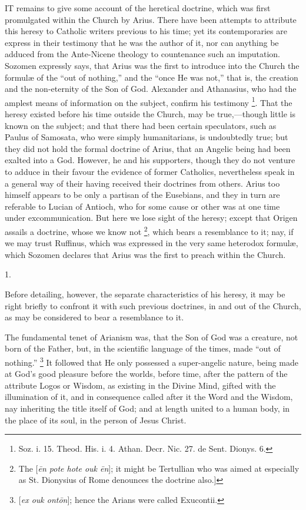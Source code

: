 IT remains to give some account of the
heretical doctrine, which was first promulgated within the Church by
Arius. There have been attempts to attribute this heresy to Catholic
writers previous to his time; yet its contemporaries are express in
their testimony that he was the author of it, nor can anything be
adduced from the Ante-Nicene theology to countenance such an
imputation. Sozomen expressly says, that Arius was the first to
introduce into the Church the formulæ of the ``out of
nothing,'' and the ``once He was not,'' that is, the
creation and the non-eternity of the Son of God. Alexander and
Athanasius, who had the amplest means of information on the subject,
confirm his testimony \footnote{Soz. i. 15. Theod. His. i. 4. Athan. Decr. Nic. 27. de Sent.
Dionys. 6.}.
That the heresy existed before his time outside the Church, may be
true,—though little is known on the subject; and that there had been
certain speculators, such as Paulus of Samosata, who were simply
humanitarians, is undoubtedly true; but they did not hold the formal
doctrine of Arius, that an Angelic being had been exalted into a God.
However, he and his supporters, though they do not venture to
adduce in their favour the evidence of former Catholics, nevertheless
speak in a general way of their having received their doctrines from
others. Arius too himself appears to be only a partisan of the
Eusebians, and they in turn are referable to Lucian of Antioch, who
for some cause or other was at one time under excommunication. But
here we lose sight of the heresy; except that Origen assails a
doctrine, whose we know not \footnote{The [\emph{\={e}n pote hote ouk \={e}n}];
it might be Tertullian who was aimed at especially as St. Dionysius of
Rome denounces the doctrine also.]},
which bears a resemblance to it; nay, if we may trust Ruffinus, which
was expressed in the very same heterodox formulæ, which Sozomen
declares that Arius was the first to preach within the Church.

1.

Before detailing, however, the separate characteristics of his
heresy, it may be right briefly to confront it with such previous
doctrines, in and out of the Church, as may be considered to bear a
resemblance to it.

The fundamental tenet of Arianism was, that the Son of God was a
creature, not born of the Father, but, in the scientific language of
the times, made ``out of nothing.'' \footnote{[\emph{ex ouk ont\={o}n}]; hence the
Arians were called Exucontii.} It followed that He only possessed a super-angelic nature,
being made at God's good pleasure before the worlds, before time,
after the pattern of the attribute Logos or Wisdom, as existing in the
Divine Mind, gifted with the illumination of it, and in consequence
called after it the Word and the Wisdom, nay inheriting the
title itself of God; and at length united to a human body, in the
place of its soul, in the person of Jesus Christ.

